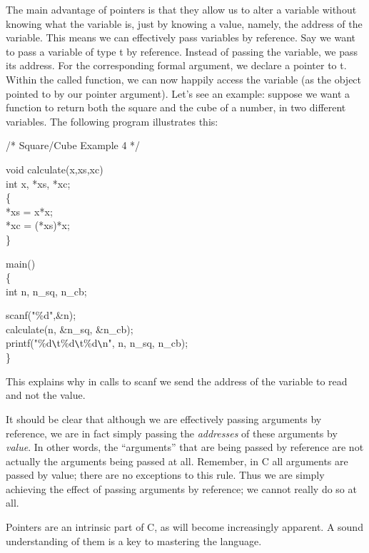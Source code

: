      The main  advantage of pointers is that they allow us to alter a
variable without knowing  what the  variable is,  just by  knowing a
value, namely, the address of  the variable.  This means  we can 
effectively pass  variables  by reference. Say  we want  to pass a
variable of type {\ms t\/} by reference. Instead of passing the 
variable, we  pass its  address.  For  the  corresponding  formal
argument, we  declare a  {\ms pointer to  t\/}. Within the called
function, we can now happily access  the  variable  (as  the  object 
pointed  to  by  our  pointer argument). Let's see an example:
suppose we want a function to return both the square and  the cube of
a  number, in  two different variables. The following program
illustrates this:
\begin{code}
 /* Square/Cube Example 4 */ \addVspace

 void calculate(x,xs,xc) \\
 \> int x, *xs, *xc; \\
 \{ \+\\
      {*}xs = x*x; \\
      {*}xc = (*xs)*x; 
		\-\\
 \} \addVspace

 main() \\
 \{ \+\\
      int n, n\_sq, n\_cb; \addVspace

      scanf("\%d",\&n); \\
      calculate(n, \&n\_sq, \&n\_cb); \\
      printf("\%d\verb+\+t\%d\verb+\+t\%d\verb+\+n", n, n\_sq, n\_cb);
		\-\\
 \}

\end{code}
\noindent
 This explains  why in  calls to {\cd scanf} we send the
address of the variable to read and not the value.

It should be clear that although we are effectively passing arguments by
reference, we are in fact simply passing the {\em addresses} of these arguments
by {\em value}. In other words, the ``arguments'' that are being passed by
reference are not actually the arguments being passed at all. Remember, in C all
arguments are passed by value; there are no exceptions to this rule. Thus we are simply achieving the effect of
passing arguments by reference; we cannot really do so at all.

     Pointers are  an  intrinsic  part  of  C,  as  will  become 
increasingly apparent. A sound understanding of them is a key to
mastering the language.

